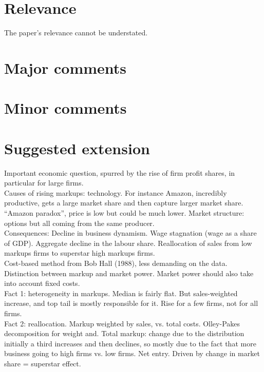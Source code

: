 \documentclass{amsart}
\theoremstyle{definition}
\theoremstyle{remark}
\numberwithin{equation}{section}
\begin{document}
\section{Relevance}

The paper's relevance cannot be understated.

\section{Major comments}

\section{Minor comments}

\section{Suggested extension}

Important economic question, spurred by the rise of firm profit shares, in particular for large firms.\\

Causes of rising markups: technology. For instance Amazon, incredibly productive, gets a large market share and then capture larger market share. ``Amazon paradox'', price is low but could be much lower. Market structure: options but all coming from the same producer.\\

Consequences: Decline in business dynamism. Wage stagnation (wage as a share of GDP). Aggregate decline in the labour share. Reallocation of sales from low markups firms to superstar high markups firms.\\

Cost-based method from Bob Hall (1988), less demanding on the data. \\

Distinction between markup and market power. Market power should also take into account fixed costs.\\

Fact 1: heterogeneity in markups. Median is fairly flat. But sales-weighted increase, and top tail is mostly responsible for it. Rise for a few firms, not for all firms.\\

Fact 2: reallocation. Markup weighted by sales, vs. total costs. Olley-Pakes decomposition for weight and. Total markup: change due to the distribution initially a third increases and then declines, so mostly due to the fact that more business going to high firms vs. low firms. Net entry. Driven by change in market share = superstar effect. \\
\end{document}
